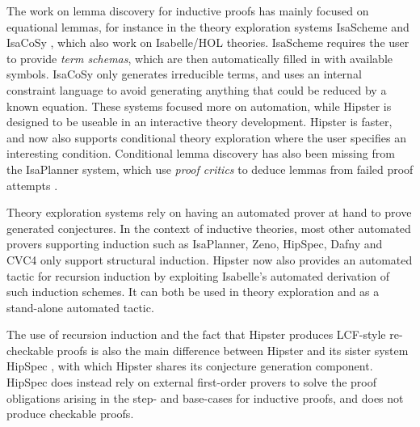 \label{sec:related}

The work on lemma discovery for inductive proofs has mainly focused on equational lemmas, for instance in the theory exploration systems IsaScheme and IsaCoSy \cite{isascheme,isacosy}, which also work on Isabelle/HOL theories. IsaScheme requires the user to provide \emph{term schemas}, which are then automatically filled in with available symbols. IsaCoSy only generates irreducible terms, and uses an internal constraint language to avoid generating anything that could be reduced by a known equation. These systems focused more on automation, while Hipster is designed to be useable in an interactive theory development. Hipster is faster, and now also supports conditional theory exploration where the user specifies an interesting condition. Conditional lemma discovery has also been missing from the IsaPlanner system, which use \emph{proof critics} to deduce lemmas from failed proof attempts \cite{isaplanner2,IsaPcase}. 

Theory exploration systems rely on having an automated prover at hand to prove generated conjectures. In the context of inductive theories, most other automated provers supporting induction such as IsaPlanner, Zeno, HipSpec, Dafny and CVC4 \cite{isaplanner2, zeno, hipspecCADE,dafny,cvc4} only support structural induction. Hipster now also provides an automated tactic for recursion induction by exploiting Isabelle's automated derivation of such induction schemes. It can both be used in theory exploration and as a stand-alone automated tactic.

The use of recursion induction and the fact that Hipster produces LCF-style re-checkable proofs is also the main difference between Hipster and its sister system HipSpec \cite{hipspecCADE}, with which Hipster shares its conjecture generation component. HipSpec does instead rely on external first-order provers to solve the proof obligations arising in the step- and base-cases for inductive proofs, and does not produce checkable proofs.